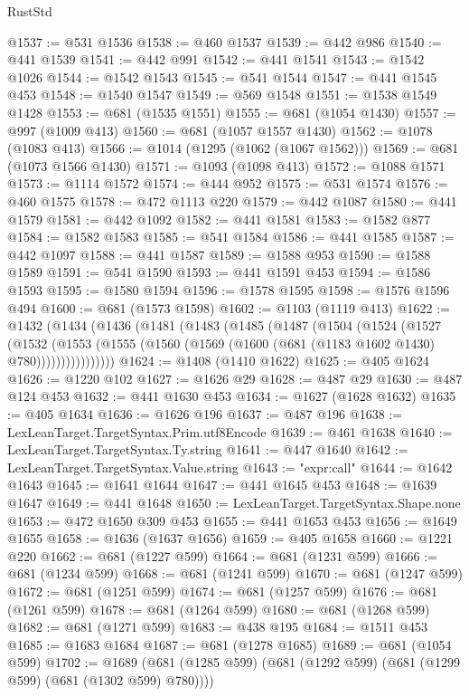 \begin{lexlean}{RustStd}
\begin{coremodule}
@1537 := @531 @1536
@1538 := @460 @1537
@1539 := @442 @986
@1540 := @441 @1539
@1541 := @442 @991
@1542 := @441 @1541
@1543 := @1542 @1026
@1544 := @1542 @1543
@1545 := @541 @1544
@1547 := @441 @1545 @453
@1548 := @1540 @1547
@1549 := @569 @1548
@1551 := @1538 @1549 @1428
@1553 := @681 (@1535 @1551)
@1555 := @681 (@1054 @1430)
@1557 := @997 (@1009 @413)
@1560 := @681 (@1057 @1557 @1430)
@1562 := @1078 (@1083 @413)
@1566 := @1014 (@1295 (@1062 (@1067 @1562)))
@1569 := @681 (@1073 @1566 @1430)
@1571 := @1093 (@1098 @413)
@1572 := @1088 @1571
@1573 := @1114 @1572
@1574 := @444 @952
@1575 := @531 @1574
@1576 := @460 @1575
@1578 := @472 @1113 @220
@1579 := @442 @1087
@1580 := @441 @1579
@1581 := @442 @1092
@1582 := @441 @1581
@1583 := @1582 @877
@1584 := @1582 @1583
@1585 := @541 @1584
@1586 := @441 @1585
@1587 := @442 @1097
@1588 := @441 @1587
@1589 := @1588 @953
@1590 := @1588 @1589
@1591 := @541 @1590
@1593 := @441 @1591 @453
@1594 := @1586 @1593
@1595 := @1580 @1594
@1596 := @1578 @1595
@1598 := @1576 @1596 @494
@1600 := @681 (@1573 @1598)
@1602 := @1103 (@1119 @413)
@1622 := @1432
    (@1434
      (@1436
        (@1481
          (@1483
            (@1485
              (@1487
                (@1504
                  (@1524
                    (@1527
                      (@1532
                        (@1553
                          (@1555 (@1560 (@1569 (@1600 (@681 (@1183 @1602 @1430) @780))))))))))))))))
@1624 := @1408 (@1410 @1622)
@1625 := @405 @1624
@1626 := @1220 @102
@1627 := @1626 @29
@1628 := @487 @29
@1630 := @487 @124 @453
@1632 := @441 @1630 @453
@1634 := @1627 (@1628 @1632)
@1635 := @405 @1634
@1636 := @1626 @196
@1637 := @487 @196
@1638 := LexLeanTarget.TargetSyntax.Prim.utf8Encode
@1639 := @461 @1638
@1640 := LexLeanTarget.TargetSyntax.Ty.string
@1641 := @447 @1640
@1642 := LexLeanTarget.TargetSyntax.Value.string
@1643 := "expr:call"
@1644 := @1642 @1643
@1645 := @1641 @1644
@1647 := @441 @1645 @453
@1648 := @1639 @1647
@1649 := @441 @1648
@1650 := LexLeanTarget.TargetSyntax.Shape.none
@1653 := @472 @1650 @309 @453
@1655 := @441 @1653 @453
@1656 := @1649 @1655
@1658 := @1636 (@1637 @1656)
@1659 := @405 @1658
@1660 := @1221 @220
@1662 := @681 (@1227 @599)
@1664 := @681 (@1231 @599)
@1666 := @681 (@1234 @599)
@1668 := @681 (@1241 @599)
@1670 := @681 (@1247 @599)
@1672 := @681 (@1251 @599)
@1674 := @681 (@1257 @599)
@1676 := @681 (@1261 @599)
@1678 := @681 (@1264 @599)
@1680 := @681 (@1268 @599)
@1682 := @681 (@1271 @599)
@1683 := @438 @195
@1684 := @1511 @453
@1685 := @1683 @1684
@1687 := @681 (@1278 @1685)
@1689 := @681 (@1054 @599)
@1702 := @1689 (@681 (@1285 @599) (@681 (@1292 @599) (@681 (@1299 @599) (@681 (@1302 @599) @780))))

\end{coremodule}
\end{lexlean}
